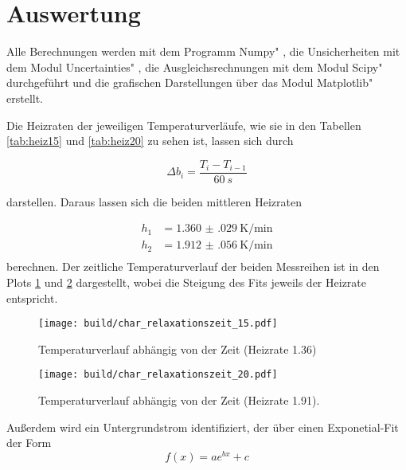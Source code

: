 \section{Auswertung}
\label{sec:Auswertung}
Alle Berechnungen werden mit dem Programm \glqq Numpy" \cite{numpy}, die Unsicherheiten mit dem Modul \glqq Uncertainties" \cite{uncertainties}, die Ausgleichsrechnungen mit dem Modul \glqq Scipy" \cite{scipy} durchgeführt und die grafischen Darstellungen über das Modul \glqq Matplotlib" \cite{matplotlib} erstellt.

Die Heizraten der jeweiligen Temperaturverläufe, wie sie in den Tabellen \ref{tab:heiz15} und \ref{tab:heiz20} zu sehen ist, lassen sich durch 

\begin{equation}
    \Delta b_i = \frac{T_i - T_{i-1}}{\SI{60}{s} }
\end{equation}

darstellen. Daraus lassen sich die beiden mittleren Heizraten 

\begin{align*}
    h_1 &=  \SI{1.360(029)}{\kelvin\per\minute}  \\
    h_2 &=  \SI{1.912(056)}{\kelvin\per\minute} \\
\end{align*}
berechnen. Der zeitliche Temperaturverlauf der beiden Messreihen ist in den Plots \ref{fig:h1} und \ref{fig:h2} dargestellt, wobei die Steigung des Fits 
jeweils der Heizrate entspricht. 

\begin{figure}
    \centering
    \texttt{[image: build/char\_relaxationszeit\_15.pdf]}
    \caption{Temperaturverlauf abhängig von der Zeit (Heizrate 1.36)}
    \label{fig:h1}
\end{figure}
\hfill
\begin{figure}
    \centering
    \texttt{[image: build/char\_relaxationszeit\_20.pdf]}
    \caption{Temperaturverlauf abhängig von der Zeit (Heizrate 1.91).}
    \label{fig:h2}
\end{figure}
\FloatBarrier

Außerdem wird ein Untergrundstrom identifiziert, der über einen Exponetial-Fit der Form 
\begin{equation}
    f(x) = a e^{bx} + c
\end{equation}

